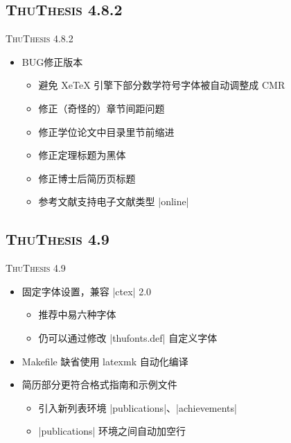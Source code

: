 \documentclass[xcolor=table,dvipsnames,svgnames]{beamer}
\newcommand{\ThuThesis}{\textsc{ThuThesis}\xspace}
\begin{document}
\subsection{\ThuThesis 4.8.2}
\begin{frame}[fragile]{\ThuThesis 4.8.2}
  \begin{itemize}
    \item BUG修正版本
      \begin{itemize}
        \item 避免 XeTeX 引擎下部分数学符号字体被自动调整成 CMR
        \item 修正（奇怪的）章节间距问题
        \item 修正学位论文中目录里节前缩进
        \item 修正定理标题为黑体
        \item 修正博士后简历页标题
        \item 参考文献支持电子文献类型 |online|
      \end{itemize}
  \end{itemize}
\end{frame}

\subsection{\ThuThesis 4.9}
\begin{frame}[fragile]{\ThuThesis 4.9}
  \begin{itemize}
    \item 固定字体设置，兼容 |ctex| 2.0
      \begin{itemize}
        \item 推荐中易六种字体
        \item 仍可以通过修改 |thufonts.def| 自定义字体
      \end{itemize}
    \item Makefile 缺省使用 latexmk 自动化编译
    \item 简历部分更符合格式指南和示例文件
      \begin{itemize}
        \item 引入新列表环境 |publications|、|achievements|
        \item |publications| 环境之间自动加空行
      \end{itemize}
  \end{itemize}
\end{frame}
\end{document}
